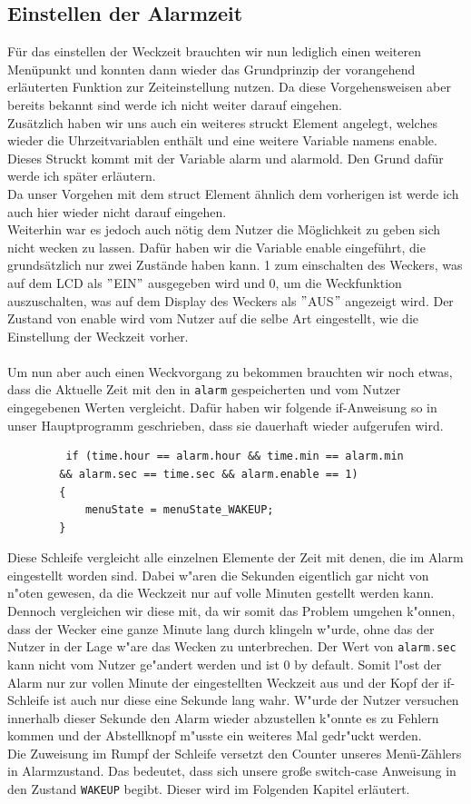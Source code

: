 \documentclass[openright,twoside,11pt,a4paper]{scrartcl}
\begin{document}
\begin{flushleft}
	 	\subsection{Einstellen der Alarmzeit}
		 Für das einstellen der Weckzeit brauchten wir nun lediglich einen weiteren Menüpunkt und konnten dann wieder das Grundprinzip der vorangehend erläuterten Funktion zur Zeiteinstellung nutzen. Da diese Vorgehensweisen aber bereits bekannt sind werde ich nicht weiter darauf eingehen.\\
		 Zusätzlich haben wir uns auch ein weiteres struckt Element angelegt, welches wieder die Uhrzeitvariablen enthält und eine weitere Variable namens enable. Dieses Struckt kommt mit der Variable alarm und alarmold. Den Grund dafür werde ich später erläutern. \\
		 Da unser Vorgehen mit dem struct Element ähnlich dem vorherigen ist werde ich auch hier wieder nicht darauf eingehen.\\
	 	Weiterhin war es jedoch auch nötig dem Nutzer die Möglichkeit zu geben sich nicht wecken zu lassen. Dafür haben wir die Variable enable eingeführt, die grundsätzlich nur zwei Zustände haben kann. 1 zum einschalten des Weckers, was auf dem LCD als $"$EIN$"$ ausgegeben wird und 0, um die Weckfunktion auszuschalten, was auf dem Display des Weckers als $"$AUS$"$ angezeigt wird. Der Zustand von enable wird vom Nutzer auf die selbe Art eingestellt, wie die Einstellung der Weckzeit vorher. \\
	 	\ \\
	 	Um nun aber auch einen Weckvorgang zu bekommen brauchten wir noch etwas, dass die Aktuelle Zeit mit den in \lstinline[language=c++]|alarm| gespeicherten und vom Nutzer eingegebenen Werten vergleicht. Dafür haben wir folgende if-Anweisung so in unser Hauptprogramm geschrieben, dass sie dauerhaft wieder aufgerufen wird.
	 	\begin{lstlisting}
	 	 if (time.hour == alarm.hour && time.min == alarm.min
	 	&& alarm.sec == time.sec && alarm.enable == 1)
	 	{ 
	 		menuState = menuState_WAKEUP;
	 	}
	 	\end{lstlisting}
	 	Diese Schleife vergleicht alle einzelnen Elemente der Zeit mit denen, die im Alarm eingestellt worden sind. Dabei w"aren die Sekunden eigentlich gar nicht von n"oten gewesen, da die Weckzeit nur auf volle Minuten gestellt werden kann. Dennoch vergleichen wir diese mit, da wir somit das Problem umgehen k"onnen, dass der Wecker eine ganze Minute lang durch klingeln w"urde, ohne das der Nutzer in der Lage w"are das Wecken zu unterbrechen. Der Wert von \lstinline[language=c++]|alarm.sec| kann nicht vom Nutzer ge"andert werden und ist 0 by default. Somit l"ost der Alarm nur zur vollen Minute der eingestellten Weckzeit aus und der Kopf der if-Schleife ist auch nur diese eine Sekunde lang wahr. W"urde der Nutzer versuchen innerhalb dieser Sekunde den Alarm wieder abzustellen k"onnte es zu Fehlern kommen und der Abstellknopf m"usste ein weiteres Mal gedr"uckt werden.\\
	 	Die Zuweisung im Rumpf der Schleife versetzt den Counter unseres Menü-Zählers in Alarmzustand. Das bedeutet, dass sich unsere große switch-case Anweisung in den Zustand \lstinline[language=c++]|WAKEUP| begibt. Dieser wird im Folgenden Kapitel erläutert.

\end{flushleft}
\end{document}
